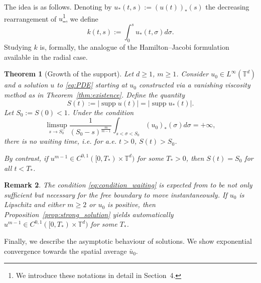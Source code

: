 \documentclass[11pt]{article}
\newtheorem{thm}{Theorem}[section]
\newtheorem{remark}[thm]{Remark}
\numberwithin{equation}{section} %
\DeclareMathOperator{\supp}{supp}
\newcommand{\T}{{\mathbb{T}}}
\begin{document}
The idea is as follows. Denoting by $u_*(t,s) := (u(t))_*(s)$ the decreasing rearrangement of $u$\footnote{We introduce these notations in detail in Section~4.}, we define 
\begin{equation*}
    k(t,s) := \int_0^s u_*(t,\sigma)d\sigma.
\end{equation*}
Studying $k$ is, formally, the analogue of the Hamilton–Jacobi formulation available in the radial case.

\begin{thm}[Growth of the support]\label{thm:waitingtime}
   Let $d\ge 1$, $m\ge1$. Consider $u_0\in L^\infty(\T^d)$ and a solution $u$ to \eqref{eq:PDE} starting at $u_0$ constructed via a vanishing viscosity method as in Theorem~\ref{thm:existence}. Define the quantity
   $$S(t):=|\supp u(t)| = |\supp u_{*}(t)|.$$
   Let $S_0:=S(0) <1$. Under the condition \begin{equation}\label{eq:condition_waiting}
        \limsup_{s\to S_0^{-}} \frac{1}{(S_0-s)^{\frac{m}{m-1}}}\int_{ s<\sigma<S_0} (u_0)_{*}(\sigma)d\sigma =+\infty,
    \end{equation}
    there is no waiting time, i.e. for a.e. $t>0$, $S(t)>S_0$.

    By contrast, if $u^{m-1}\in C^{0,1}([0,T_*)\times \T^d)$ for some $T_*>0$, then $S(t) = S_0$ for all $t<T_*$.
\end{thm}

\begin{remark}
The condition \eqref{eq:condition_waiting} is expected from \cite{CGV2022vortex} to be not only sufficient but necessary for the free boundary to move instantaneously. If $u_{0}$ is Lipschitz and either $m\ge 2$ or $u_{0}$ is positive, then Proposition~\ref{prop:strong_solution} yields automatically $u^{m-1}\in C^{0,1}([0,T_*)\times \T^d)$ for some $T_{*}$.
\end{remark}


Finally, we describe the asymptotic behaviour of solutions. We show exponential convergence towards the spatial average $\bar{u}_{0}$.
\end{document}
